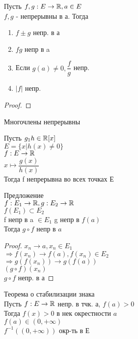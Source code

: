 \begin{properties}
	Пусть $ f, g : E \rightarrow \mathbb{R}, a \in E$ \\
	 $ f, g $ - непрерывны в а. Тогда \\
	 \begin{enumerate}
	 	\item $ f \pm g $ непр. в а
	 	\item $ fg $ непр в a 
	 	\item Если  $ g(a) \neq 0, \dfrac{f}{g} $ непр.
	 	\item $|f|$ непр. 
	 \end{enumerate}
 	\begin{proof}
 	\end{proof}
	Многочлены непрерывны
	\begin{consequence}
		Пусть $ g_1 h \in \mathbb{R}[x] $ \\
		$ E = \{ x | h(x) \neq 0 \} $ \\
		$ f : E \rightarrow \mathbb{R} $ \\
		$ x \mapsto \dfrac{g(x)}{h(x)} $ \\
		Тогда f непрерывна во всех точках Е \\
		
 	\end{consequence}
 Предложение \\
 $ f : E_1 \rightarrow \mathbb{R} , g : E_2 \rightarrow \mathbb{R}$ \\
 $ f(E_1) \subset E_2 $ \\
 f непр в a  $ \in E_1 $ g непр  в $ f(a)$\\
 Тогда $ g \circ f $ непр в $ a $ \\
 \begin{proof}
 	$ x_n \rightarrow a, x_n \in E_1 $ \\
 	$ \Rightarrow f(x_n) \rightarrow f(a), f(x_n) \in E_2 $\\
 	$ \Rightarrow g(f(x_n))  \rightarrow g(f(a))$ \\
 	$ (g\circ f) (x_n) $\\
 	$ g \circ f $ непр. в а 	
 \end{proof}
  \begin{theorem}
  	Теорема о стабилизации знака \\
  	Пусть $ f : E \rightarrow \mathbb{R}  $ непр. в тчк. а, $ f(a) > 0$\\
  	Тогда $ f(x) > 0 $ в нек окрестности $a$ \\
  	$ f(a) \in (0, +\infty) $ \\
  	$ f^{-1} ((0, +\infty)) $ окр-ть в Е
  \end{theorem}
\end{properties} 

